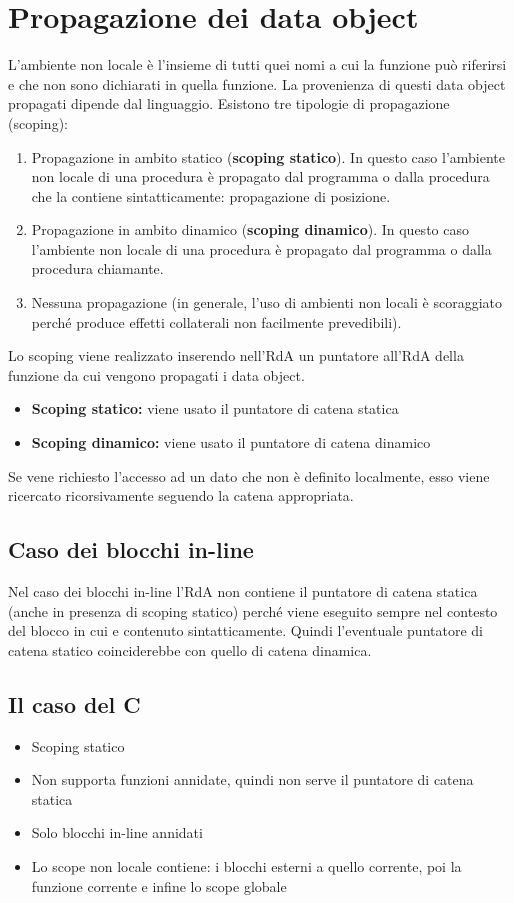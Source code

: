 \documentclass[10pt]{article}
\begin{document}
\section{Propagazione dei data object}
L'ambiente non locale è l'insieme di tutti quei nomi a cui la funzione può riferirsi e che non sono dichiarati in quella funzione. La provenienza di questi data object propagati dipende dal linguaggio.
Esistono tre tipologie di propagazione (scoping):
\begin{enumerate}
    \item Propagazione in ambito statico (\textbf{scoping statico}). In  questo caso l'ambiente non locale di una procedura è propagato dal programma o dalla procedura che la contiene sintatticamente: propagazione di posizione.
    \item Propagazione in ambito dinamico (\textbf{scoping dinamico}). In questo caso l'ambiente non locale di una procedura è propagato dal programma o dalla procedura chiamante.
    \item Nessuna propagazione (in generale, l'uso di ambienti non locali è scoraggiato perché produce effetti collaterali non facilmente prevedibili).
\end{enumerate}
Lo scoping viene realizzato inserendo nell'RdA un puntatore all'RdA della funzione da cui vengono propagati i data object.
\begin{itemize}
    \item \textbf{Scoping statico:} viene usato il puntatore di catena statica
    \item \textbf{Scoping dinamico:} viene usato il puntatore di catena dinamico
\end{itemize}
Se vene richiesto l'accesso ad un dato che non è definito localmente, esso viene ricercato ricorsivamente seguendo la catena appropriata.
\subsection{Caso dei blocchi in-line}
Nel caso dei blocchi in-line l'RdA non contiene il puntatore di catena statica (anche in presenza di scoping statico) perché viene eseguito sempre nel contesto del blocco in cui e contenuto sintatticamente. Quindi l'eventuale puntatore di catena statico coinciderebbe con quello di catena dinamica.
\subsection{Il caso del C}
\begin{itemize}
    \item Scoping statico
    \item Non supporta funzioni annidate, quindi non serve il puntatore di catena statica
    \item Solo blocchi in-line annidati
    \item Lo scope non locale contiene: i blocchi esterni a quello corrente, poi la funzione corrente e infine lo scope globale
\end{itemize}
\end{document}
